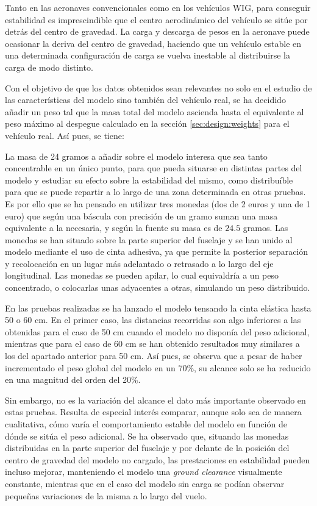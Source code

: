 Tanto en las aeronaves convencionales como en los vehículos WIG, para conseguir estabilidad es imprescindible que el centro aerodinámico del vehículo se sitúe por detrás del centro de gravedad. La carga y descarga de pesos en la aeronave puede ocasionar la deriva del centro de gravedad, haciendo que un vehículo estable en una determinada configuración de carga se vuelva inestable al distribuirse la carga de modo distinto.

Con el objetivo de que los datos obtenidos sean relevantes no solo en el estudio de las características del modelo sino también del vehículo real, se ha decidido añadir un peso tal que la masa total del modelo ascienda hasta el equivalente al peso máximo al despegue calculado en la sección \ref{sec:design:weights} para el vehículo real. Así pues, se tiene:

La masa de 24 gramos a añadir sobre el modelo interesa que sea tanto concentrable en un único punto, para que pueda situarse en distintas partes del modelo y estudiar su efecto sobre la estabilidad del mismo, como distribuíble para que se puede repartir a lo largo de una zona determinada en otras pruebas. Es por ello que se ha pensado en utilizar tres monedas (dos de 2 euros y una de 1 euro) que según una báscula con precisión de un gramo suman una masa equivalente a la necesaria, y según la fuente \cite{ref:pesomonedas} su masa es de $24.5$ gramos. Las monedas se han situado sobre la parte superior del fuselaje y se han unido al modelo mediante el uso de cinta adhesiva, ya que permite la posterior separación y recolocación en un lugar más adelantado o retrasado a lo largo del eje longitudinal. Las monedas se pueden apilar, lo cual equivaldría a un peso concentrado, o colocarlas unas adyacentes a otras, simulando un peso distribuido.

En las pruebas realizadas se ha lanzado el modelo tensando la cinta elástica hasta 50 o 60 cm. En el primer caso, las distancias recorridas son algo inferiores a las obtenidas para el caso de 50 cm cuando el modelo no disponía del peso adicional, mientras que para el caso de 60 cm se han obtenido resultados muy similares a los del apartado anterior para 50 cm. Así pues, se observa que a pesar de haber incrementado el peso global del modelo en un 70\%, su alcance solo se ha reducido en una magnitud del orden del 20\%.

Sin embargo, no es la variación del alcance el dato más importante observado en estas pruebas. Resulta de especial interés comparar, aunque solo sea de manera cualitativa, cómo varía el comportamiento estable del modelo en función de dónde se sitúa el peso adicional. Se ha observado que, situando las monedas distribuidas en la parte superior del fuselaje y por delante de la posición del centro de gravedad del modelo no cargado, las prestaciones en estabilidad pueden incluso mejorar, manteniendo el modelo una \emph{ground clearance} visualmente constante, mientras que en el caso del modelo sin carga se podían observar pequeñas variaciones de la misma a lo largo del vuelo.

